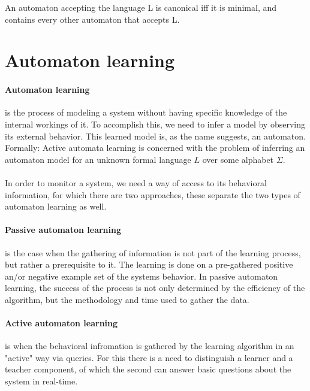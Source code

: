 \begin{definition}
	An automaton accepting the language L is canonical iff it is minimal, and contains every other automaton that accepts L.
\end{definition}

\section{Automaton learning}



\paragraph{Automaton learning}  is the process of modeling a system without having specific knowledge of the internal workings of it. To accomplish this, we need to infer a model by observing its external behavior. This learned model is, as the name suggests, an automaton. 
\\Formally: Active  automata  learning is  concerned  with  the  problem  of  inferring  an automaton model for an unknown formal language $L$ over some alphabet $\Sigma$\cite{Howar2018}.
\\\\In order to monitor a system, we need a way of access to its behavioral information, for which there are two approaches, these separate the two types of automaton learning as well.

\paragraph{Passive automaton learning} is the case when the gathering of information is not part of the learning process, but rather a prerequisite to it. The learning is done on a pre-gathered positive an/or negative example set of the systems behavior. In passive automaton learning, the success of the process is not only determined by the efficiency of the algorithm, but the methodology and time used to gather the data.

\paragraph{Active automaton learning} is when the behavioral infromation is gathered by the learning algorithm in an "active" way via queries. For this there is a need to distinguish a learner and a teacher component, of which the second can answer basic questions about the system in real-time. 


